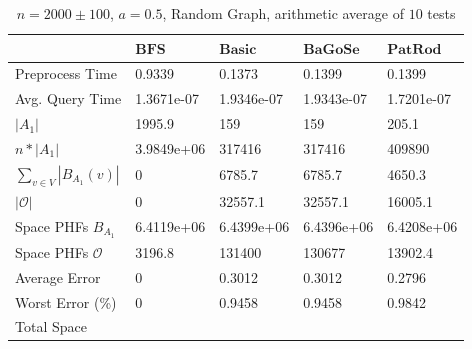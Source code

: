 \documentclass[shortabstract, lic, english]{iithesis}
\theoremstyle{definition} \newtheorem{definition}{Definition}[chapter]
\theoremstyle{remark} \newtheorem{remark}[definition]{Observation}
\theoremstyle{plain} \newtheorem{theorem}[definition]{Theorem}
\theoremstyle{plain} \newtheorem{lemma}[definition]{Lemma}
\theoremstyle{plain} \newtheorem{conjecture}[definition]{Conjecture}
\begin{document}
\begin{table}[H] \label{test:random.a0.5}
    \centering
    \begin{tabular}{ |p{3cm}||p{2cm}|p{2cm}|p{2cm}|p{2cm}|  } 
        \hline
        & $\mathbf{BFS}$ & $\mathbf{Basic}$ & $\mathbf{BaGoSe}$ & $\mathbf{PatRod}$ \\
        \hline
        \hline
        Preprocess Time                 & 0.9339     & 0.1373     & 0.1399      & 0.1399     \\
        \hline
        Avg. Query Time                 & 1.3671e-07 & 1.9346e-07 & 1.9343e-07  & 1.7201e-07 \\
        \hline
        $|A_1|$                         & 1995.9     & 159        & 159         & 205.1      \\
        \hline
        $n * |A_1|$                     & 3.9849e+06 & 317416     & 317416      & 409890     \\
        \hline
        $\sum_{v \in V} |B_{A_1}(v)| $  & 0          & 6785.7     & 6785.7      & 4650.3     \\
        \hline
        $|\mathcal{O}|$                 & 0          & 32557.1    & 32557.1     & 16005.1    \\
        \hline
        Space PHFs $B_{A_1}$            & 6.4119e+06 & 6.4399e+06 & 6.4396e+06  & 6.4208e+06 \\
        \hline
        Space PHFs $\mathcal{O}$        & 3196.8     & 131400     & 130677      & 13902.4    \\
        \hline
        Average Error                   & 0          & 0.3012     & 0.3012      & 0.2796     \\
        \hline
        Worst Error (\%)                & 0          & 0.9458     & 0.9458      & 0.9842     \\
        \hline
        Total Space                     &            &            &             &            \\
        \hline

    \end{tabular}
    \caption{$n = 2000 \pm 100$, $a = 0.5$, Random Graph, arithmetic average of $10$ tests}
\end{table}
\end{document}

